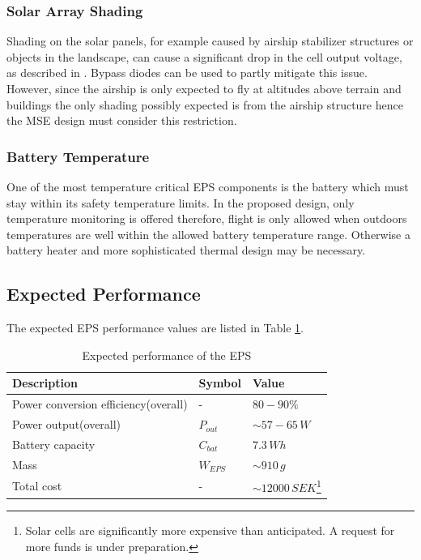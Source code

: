 \subsubsection*{Solar Array Shading}
Shading on the solar panels, for example caused by airship stabilizer structures or objects in the landscape, can cause a significant drop in the cell output voltage, as described in \cite[p. 165]{Mukund}. Bypass diodes can be used to partly mitigate this issue. However, since the airship is only expected to fly at altitudes above terrain and buildings the only shading possibly expected is from the airship structure hence the \ac{MSE} design must consider this restriction.
%
\subsubsection*{Battery Temperature}
One of the most temperature critical \ac{EPS} components is the battery which must stay within its safety temperature limits. In the proposed design, only temperature monitoring is offered therefore, flight is only allowed when outdoors temperatures are well within the allowed battery temperature range. Otherwise a battery heater and more sophisticated thermal design may be necessary.
%
\subsection{Expected Performance}
The expected \ac{EPS} performance values are listed in Table \ref{tab:expected_performance}.
%
\begin{table}[H]
\centering
\caption{Expected performance of the \ac{EPS}}
\label{tab:expected_performance}
\begin{minipage}{\textwidth}
\begin{tabular}{p{}p{}p{}}
\hline
\textbf{Description} & \textbf{Symbol} & \textbf{Value}\\
\hline
Power conversion efficiency(overall) & - & $80-90\%$\\
Power output(overall) & $P_{out}$ & $\sim 57-65\,W$\\
Battery capacity & $C_{bat}$ & $7.3\,Wh$\\
Mass & $W_{EPS}$ & $\sim910\,g$\\
Total cost & - & $\sim12000\,SEK$\footnote{Solar cells are significantly more expensive than anticipated. A request for more funds is under preparation.}\\
\hline
\end{tabular}\par
\vspace{-0.75\skip\footins}
\renewcommand{\footnoterule}{}
\end{minipage}
\end{table}
%
%
